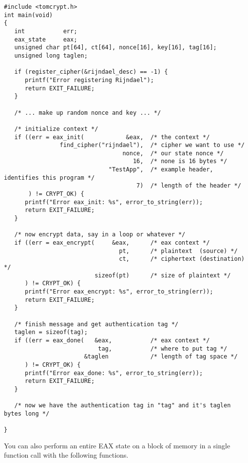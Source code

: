 \documentclass[a4paper]{book}
\begin{document}
\begin{verbatim}
#include <tomcrypt.h>
int main(void)
{
   int           err;
   eax_state     eax;
   unsigned char pt[64], ct[64], nonce[16], key[16], tag[16];
   unsigned long taglen;

   if (register_cipher(&rijndael_desc) == -1) {
      printf("Error registering Rijndael");
      return EXIT_FAILURE;
   }

   /* ... make up random nonce and key ... */

   /* initialize context */
   if ((err = eax_init(            &eax,  /* the context */
                find_cipher("rijndael"),  /* cipher we want to use */
                                  nonce,  /* our state nonce */
                                     16,  /* none is 16 bytes */
                              "TestApp",  /* example header, identifies this program */
                                      7)  /* length of the header */
       ) != CRYPT_OK) {
      printf("Error eax_init: %s", error_to_string(err));
      return EXIT_FAILURE;
   }

   /* now encrypt data, say in a loop or whatever */
   if ((err = eax_encrypt(     &eax,      /* eax context */
                                 pt,      /* plaintext  (source) */
                                 ct,      /* ciphertext (destination) */
                          sizeof(pt)      /* size of plaintext */
      ) != CRYPT_OK) {
      printf("Error eax_encrypt: %s", error_to_string(err));
      return EXIT_FAILURE;
   }

   /* finish message and get authentication tag */
   taglen = sizeof(tag);
   if ((err = eax_done(   &eax,           /* eax context */
                           tag,           /* where to put tag */
                       &taglen            /* length of tag space */
      ) != CRYPT_OK) {
      printf("Error eax_done: %s", error_to_string(err));
      return EXIT_FAILURE;
   }

   /* now we have the authentication tag in "tag" and it's taglen bytes long */

}
\end{verbatim}
                       
You can also perform an entire EAX state on a block of memory in a single function call with the 
following functions.
\end{document}
